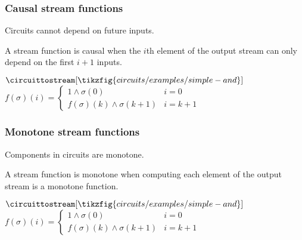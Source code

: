 \begin{frame}
    \frametitle{Causal stream functions}

    Circuits cannot depend on \alert{future inputs}.

    \pause

    A stream function is \alert{causal} when the \(i\)th element of the output stream can only depend on the first \(i+1\) inputs.

    \pause

    \begin{center}
        \(
            \circuittostream[\tikzfig{circuits/examples/simple-and}]{}
        \)
        \qquad
        \(
            f(\sigma)(i) =
            \begin{cases}
                1 \land \sigma(0) & i = 0 \\
                f(\sigma)(k) \land \sigma(k+1) & i = k+1
                
            \end{cases}
        \)
    \end{center}
\end{frame}


\begin{frame}
    \frametitle{Monotone stream functions}

    Components in circuits are \alert{monotone}.

    A stream function is \alert{monotone} when computing each element of the output stream is a monotone function.

    \begin{center}
        \(
            \circuittostream[\tikzfig{circuits/examples/simple-and}]{}
        \)
        \qquad
        \(
            f(\sigma)(i) =
            \begin{cases}
                1 \land \sigma(0) & i = 0 \\
                f(\sigma)(k) \land \sigma(k+1) & i = k+1
                
            \end{cases}
        \)
    \end{center}

\end{frame}

